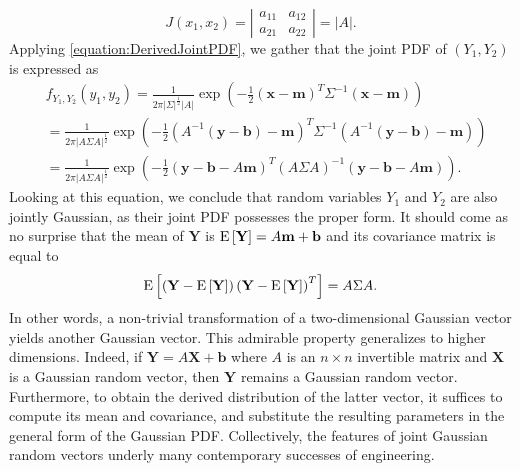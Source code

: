 \begin{example}
\begin{equation*}
J(x_1, x_2)
= \left| \begin{array}{cc} a_{11} & a_{12} \\ a_{21} & a_{22} \end{array} \right|
= | A | .
\end{equation*}
Applying \eqref{equation:DerivedJointPDF}, we gather that the joint PDF of $(Y_1, Y_2)$ is expressed as
\begin{equation*}
\begin{split}
&f_{Y_1, Y_2} (y_1, y_2)
= \frac{1}{2 \pi |\Sigma|^{\frac{1}{2}} |A|}
\exp \left( - \frac{1}{2}
\left( \mathbf{x} - \mathbf{m} \right)^T \Sigma^{-1} \left( \mathbf{x} - \mathbf{m} \right) \right) \\
&= \frac{1}{2 \pi |A \Sigma A|^{\frac{1}{2}}}
\exp \left( - \frac{1}{2}
\left( A^{-1} \left( \mathbf{y} - \mathbf{b} \right) - \mathbf{m} \right)^T
\Sigma^{-1}
\left( A^{-1} \left( \mathbf{y} - \mathbf{b} \right) - \mathbf{m} \right) \right) \\
&= \frac{1}{2 \pi |A \Sigma A|^{\frac{1}{2}}}
\exp \left( - \frac{1}{2}
\left( \mathbf{y} - \mathbf{b} - A \mathbf{m} \right)^T
\left( A \Sigma A \right)^{-1}
\left( \mathbf{y} - \mathbf{b} - A \mathbf{m} \right) \right) .
\end{split}
\end{equation*}
Looking at this equation, we conclude that random variables $Y_1$ and $Y_2$ are also jointly Gaussian, as their joint PDF possesses the proper form.
It should come as no surprise that the mean of $\mathbf{Y}$ is
$\mathrm{E} \left[ \mathbf{Y} \right] = A \mathbf{m} + \mathbf{b}$
and its covariance matrix is equal to
\begin{equation*}
\mathrm{E} \left[ \left( \mathbf{Y} - \mathrm{E} \left[ \mathbf{Y} \right] \right)
\left( \mathbf{Y} - \mathrm{E} \left[ \mathbf{Y} \right] \right)^T \right]
= A \Sigma A .
\end{equation*}
In other words, a non-trivial transformation of a two-dimensional Gaussian vector yields another Gaussian vector.
This admirable property generalizes to higher dimensions.
Indeed, if $\mathbf{Y} = A \mathbf{X} + \mathbf{b}$ where $A$ is an $n \times n$ invertible matrix and $\mathbf{X}$ is a Gaussian random vector, then $\mathbf{Y}$ remains a Gaussian random vector.
Furthermore, to obtain the derived distribution of the latter vector, it suffices to compute its mean and covariance, and substitute the resulting parameters in the general form of the Gaussian PDF.
Collectively, the features of joint Gaussian random vectors underly many contemporary successes of engineering.
\end{example}


